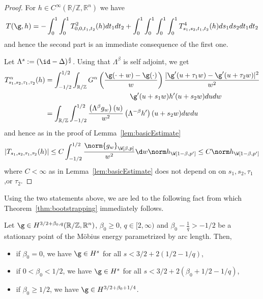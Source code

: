 \begin{proof}
 For $h \in C^{\infty}(\mathbb R / \mathbb Z, \mathbb R^n)$ we have
 \begin{align*}
  T(\g,h) = - \int_0^1 \int_0^1 T^2_{0,0,t_1,t_2}(h) dt_1 dt_2
+ \int_0^1 \int_0^1 \int_0^1 \int_0^1 T^4_{s_1,s_2,t_1,t_2}(h) ds_1  ds_2 dt_1 dt_2
 \end{align*}
 and hence the second part is an immediate consequence of the first one.

 Let $\Lambda^s := (\id-\Delta)^{\frac s 2}$. Using that $\Lambda^\beta$ is self adjoint, we get
 \begin{align*}
  T^{\alpha}_{s_1,s_2, \tau_1, \tau_2}(h) &= \int_{-1/2}^{1/2} \int_{\mathbb R / \mathbb Z} 
  G^{\alpha}\left(\frac {\g(\cdot +w)-\g(\cdot)}{w}\right)
  \frac {|\g'(u+\tau_1 w ) - \g'(u+\tau_2 w)|^2 }{w^2} 
  \\
  & \quad \quad \quad \quad \quad \quad \quad \quad \quad \quad \quad \quad    \g'(u+s_1 w) h'(u+s_2 w)  du dw
  \\&= \int_{\mathbb R / \mathbb Z}\int_{-1/2}^{1/2}
  \frac{\left(\Lambda^{\beta}g_w \right)(u)}{w^{2}}
\left( \Lambda^{-\beta}h'\right)(u+s_2 w) dw du 
 \end{align*}
 and hence as in the proof of Lemma~\ref{lem:basicEstimate}
 \begin{equation*}
  |T_{s_1,s_2, \tau_1, \tau_2}(h)|
  \leq C \int_{-1/2}^{1/2}\frac{\norm{g_{w}}_{\W[\beta,p]}}{w^{2}}\d w\norm h_{\W[1-\beta,p']}
  \le C \norm h_{\W[1-\beta,p']}
 \end{equation*}
 where $C<\infty$ as in Lemma~\ref{lem:basicEstimate} does not depend on 
 on $s_1,s_2,\tau_1$,or $\tau_2$.
\end{proof}

Using the two statements above, we are led to the following fact from which Theorem~\ref{thm:bootstrapping}
immediately follows.

\begin{lemma}\label{lem:bootstrappingStep}
 Let $\g \in H^{3/2 + \beta_0,q}(\mathbb R / \mathbb Z, \mathbb R^n)$, $\beta_0 \geq 0$, $q\in[2,\infty)$ and
 $\beta_0 - \frac 1 q > -1/2$ 
  be a stationary point of the M\"obius energy parametrized by
  arc length. Then,
\begin{itemize}
 \item if $\beta_0 =0$, we have $\g \in H^{s}$ for all $s < 3/2 + 2(1/2-1/q)$,
 \item if $0< \beta_0 < 1/2$, we have $\g \in H^{s}$ for all $s < 3/2 + 2(\beta_0 + 1/2-1/q)$,
 \item if $\beta_0 \geq 1/2$, we have $\g \in H^{3/2+\beta_0+1/4}$.
\end{itemize}

\end{lemma}


